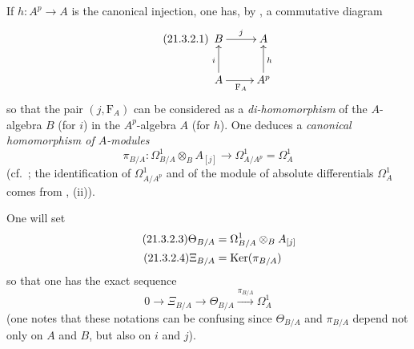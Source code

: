 \begin{env}[21.3.2]
\label{0.21.3.2}
If $h:A^p\to A$ is the canonical injection, one has, by , a commutative diagram
\begin{equation}
\tag{21.3.2.1}
  \label{0.21.3.2.1}
\xymatrix{
  B \ar[r]^{j} & A \\
  A \ar[u]^{i} \ar[r]_{\mathrm{F}_A} & A^p \ar[u]_{h}
}
\end{equation}
so that the pair $(j,\mathrm{F}_A)$ can be considered as a \emph{di-homomorphism} of the $A$-algebra $B$ (for $i$) in the $A^p$-algebra $A$ (for $h$).
One deduces a \emph{canonical homomorphism of $A$-modules}
\begin{equation}
\tag{21.3.2.2}
  \label{0.21.3.2.2}
  \pi_{B/A}:\Omega^1_{B/A}\otimes_B A_{[j]}\to\Omega^1_{A/A^p}=\Omega^1_A
\end{equation}
(cf.\ ; the identification of $\Omega^1_{A/A^p}$ and of the module of absolute differentials $\Omega^1_A$ comes from , (ii)).

One will set
\begin{align}
\tag{21.3.2.3}
  \label{0.21.3.2.3}
  \Theta_{B/A}&=\Omega^1_{B/A}\otimes_B A_{[j]} \\
\tag{21.3.2.4}
  \label{0.21.3.2.4}
  \Xi_{B/A}&=\operatorname{Ker}(\pi_{B/A})
\end{align}
so that one has the exact sequence
\begin{equation}
\tag{21.3.2.5}
  \label{0.21.3.2.5}
  0\to\Xi_{B/A}\to\Theta_{B/A}\xrightarrow{\pi_{B/A}}\Omega^1_A
\end{equation}
(one notes that these notations can be confusing since $\Theta_{B/A}$ and $\pi_{B/A}$ depend not only on $A$ and $B$, but also on $i$ and $j$).
\end{env}

